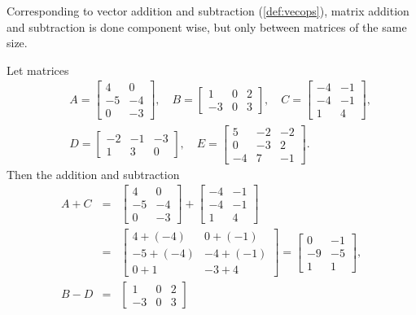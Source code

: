 Corresponding to vector addition and subtraction (\cref{def:vecops}), matrix addition and subtraction is done component wise, but only between matrices of the same size.
\begin{example} 
Let matrices
\begin{eqnarray*}&&
A=\begin{bmatrix} 4&0\\ -5&-4\\ 0&-3 \end{bmatrix},\quad
B=\begin{bmatrix} 1 & 0 & 2\\ -3 & 0 & 3 \end{bmatrix},\quad
C=\begin{bmatrix} -4 & -1\\ -4 & -1\\ 1 & 4 \end{bmatrix},\\&&
D=\begin{bmatrix} -2 & -1 & -3\\ 1 & 3 & 0 \end{bmatrix},\quad
E=\begin{bmatrix} 5 & -2 & -2\\ 0 & -3 & 2\\ -4 & 7 & -1 \end{bmatrix}
.
\end{eqnarray*}
Then the addition and subtraction
\begin{eqnarray*}
A+C&=&\begin{bmatrix} 4&0\\ -5&-4\\ 0&-3 \end{bmatrix}+
\begin{bmatrix} -4 & -1\\ -4 & -1\\ 1 & 4 \end{bmatrix}
\\&=&\begin{bmatrix} 4+(-4)&0+(-1)\\-5+(-4)&-4+(-1)\\ 0+1&-3+4 \end{bmatrix}
=\begin{bmatrix} 0&-1\\-9&-5\\ 1&1 \end{bmatrix},
\\
B-D&=&\begin{bmatrix} 1 & 0 & 2\\ -3 & 0 & 3 \end{bmatrix}

\end{eqnarray*}
\end{example}
